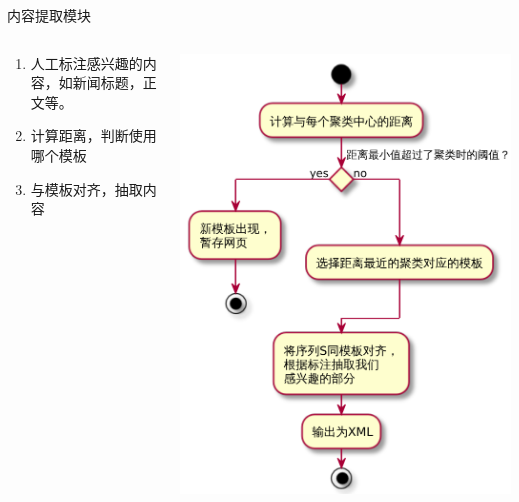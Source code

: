 \begin{frame}[label=sec-2-23]{内容提取模块}
  \begin{columns}
    \begin{column}{0.4\textwidth}
      \begin{enumerate}[<+->]
  \item 人工标注感兴趣的内容，如新闻标题，正文等。
  \item 计算距离，判断使用哪个模板
  \item 与模板对齐，抽取内容
  \end{enumerate}
    \end{column}
    \begin{column}{0.6\textwidth}
\centering
    \vspace{-3mm}
\includegraphics[width=\textwidth]{extractor}
    \end{column}
  \end{columns}
\end{frame}


